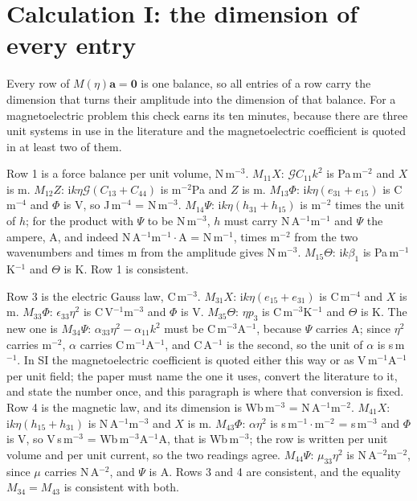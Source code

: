 \documentclass[11pt]{article}
\makeatletter
\newif\ifshowworked
\newenvironment{worked}{%
  \ifshowworked\par\smallskip\noindent\textit{Working.}\par\smallskip\else
  \setbox\z@\vbox\bgroup\fi}{\ifshowworked\par\smallskip\else\egroup\fi}
\newcommand{\ii}{\mathrm{i}}
\newcommand{\Gcal}{\mathcal{G}}
\makeatother
\begin{document}
\section{Calculation I: the dimension of every entry}

Every row of $M(\eta)\mathbf a=\mathbf 0$ is one balance, so all entries of a row carry the dimension that
turns their amplitude into the dimension of that balance. For a magnetoelectric problem this check earns its
ten minutes, because there are three unit systems in use in the literature and the magnetoelectric
coefficient is quoted in at least two of them.

\begin{worked}
Row 1 is a force balance per unit volume, N\,m$^{-3}$. $M_{11}X$: $\Gcal C_{11}k^2$ is Pa\,m$^{-2}$ and $X$
is m. $M_{12}Z$: $\ii k\eta\Gcal(C_{13}+C_{44})$ is m$^{-2}$Pa and $Z$ is m. $M_{13}\Phi$:
$\ii k\eta(e_{31}+e_{15})$ is C\,m$^{-4}$ and $\Phi$ is V, so J\,m$^{-4}$ = N\,m$^{-3}$. $M_{14}\Psi$:
$\ii k\eta(h_{31}+h_{15})$ is m$^{-2}$ times the unit of $h$; for the product with $\Psi$ to be N\,m$^{-3}$,
$h$ must carry N\,A$^{-1}$m$^{-1}$ and $\Psi$ the ampere, A, and indeed N\,A$^{-1}$m$^{-1}\cdot$A = N\,m$^{-1}$,
times m$^{-2}$ from the two wavenumbers and times m from the amplitude gives N\,m$^{-3}$. $M_{15}\Theta$:
$\ii k\beta_1$ is Pa\,m$^{-1}$K$^{-1}$ and $\Theta$ is K. Row 1 is consistent.
\end{worked}

\begin{worked}
Row 3 is the electric Gauss law, C\,m$^{-3}$. $M_{31}X$: $\ii k\eta(e_{15}+e_{31})$ is C\,m$^{-4}$ and $X$
is m. $M_{33}\Phi$: $\epsilon_{33}\eta^2$ is C\,V$^{-1}$m$^{-3}$ and $\Phi$ is V. $M_{35}\Theta$:
$\eta p_3$ is C\,m$^{-3}$K$^{-1}$ and $\Theta$ is K. The new one is $M_{34}\Psi$:
$\alpha_{33}\eta^2-\alpha_{11}k^2$ must be C\,m$^{-3}$A$^{-1}$, because $\Psi$ carries A; since $\eta^2$
carries m$^{-2}$, $\alpha$ carries C\,m$^{-1}$A$^{-1}$, and C\,A$^{-1}$ is the second, so the unit of
$\alpha$ is s\,m$^{-1}$. In SI the magnetoelectric coefficient is quoted either this way or as
V\,m$^{-1}$A$^{-1}$ per unit field; the paper must name the one it uses, convert the literature to it, and
state the number once, and this paragraph is where that conversion is fixed.
Row 4 is the magnetic law, and its dimension is Wb\,m$^{-3}$ = N\,A$^{-1}$m$^{-2}$. $M_{41}X$:
$\ii k\eta(h_{15}+h_{31})$ is N\,A$^{-1}$m$^{-3}$ and $X$ is m. $M_{43}\Phi$: $\alpha\eta^2$ is
s\,m$^{-1}\cdot$m$^{-2}$ = s\,m$^{-3}$ and $\Phi$ is V, so V\,s\,m$^{-3}$ = Wb\,m$^{-3}$A$^{-1}$A, that is
Wb\,m$^{-3}$; the row is written per unit volume and per unit current, so the two readings agree. $M_{44}\Psi$: $\mu_{33}\eta^2$ is
N\,A$^{-2}$m$^{-2}$, since $\mu$ carries N\,A$^{-2}$, and $\Psi$ is A. Rows 3 and 4 are consistent, and the
equality $M_{34}=M_{43}$ is consistent with both.
\end{worked}
\end{document}
